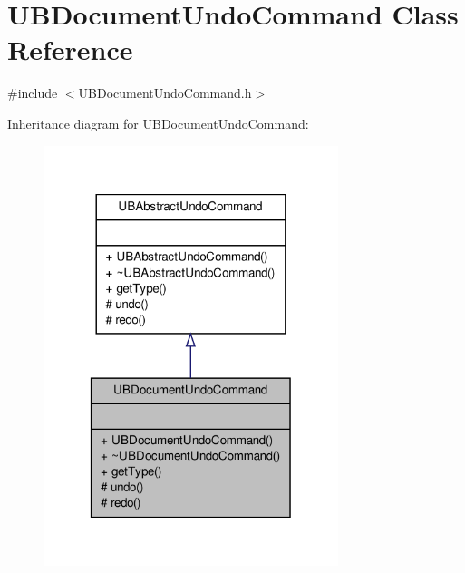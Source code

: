 \hypertarget{class_u_b_document_undo_command}{\section{U\-B\-Document\-Undo\-Command Class Reference}
\label{d7/d32/class_u_b_document_undo_command}
}


{\ttfamily \#include $<$U\-B\-Document\-Undo\-Command.\-h$>$}



Inheritance diagram for U\-B\-Document\-Undo\-Command\-:
\nopagebreak
\begin{figure}[H]
\begin{center}
\leavevmode
\includegraphics[width=244pt]{d2/d60/class_u_b_document_undo_command__inherit__graph}
\end{center}
\end{figure}


